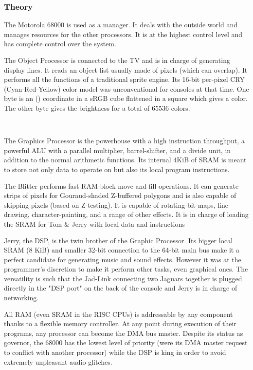 \subsubsection{Theory}
\par
The Motorola 68000 is used as a manager. It deals with the outside world and manages resources for the other processors. It is at the highest control level and has complete control over the system.\\
\par
The Object Processor is connected to the TV and is in charge of generating display lines. It reads an object list usually made of pixels (which can overlap). It performs all the functions of a traditional sprite engine. Its 16-bit per-pixel CRY (Cyan-Red-Yellow) color model was unconventional for consoles at that time. One byte is an () coordinate in a sRGB cube flattened in a square which gives a color. The other byte gives the brightness for a total of 65536 colors.\\
\par
{}\\
\par

\par
The Graphics Processor is the powerhouse with a high instruction throughput, a powerful ALU with a parallel multiplier, barrel-shifter, and a divide unit, in addition to the normal arithmetic functions. Its internal 4KiB of SRAM is meant to store not only data to operate on but also its local program instructions.\\
\par
The Blitter performs fast RAM block move and fill operations. It can generate strips of pixels for Gouraud-shaded Z-buffered polygons and is also capable of skipping pixels (based on Z-testing). It is capable of rotating bit-maps, line-drawing, character-painting, and a range of other effects. It is in charge of loading the SRAM for Tom \& Jerry with local data and instructions\\
\par
Jerry, the DSP, is the twin brother of the Graphic Processor. Its bigger local SRAM (8 KiB) and smaller 32-bit connection to the 64-bit main bus make it a perfect candidate for generating music and sound effects. However it was at the programmer's discretion to make it perform other tasks, even graphical ones. The versatility is such that the Jad-Link connecting two Jaguars together is plugged directly in the "DSP port" on the back of the console and Jerry is in charge of networking.\\
\par
All RAM (even SRAM in the RISC CPUs) is addressable by any component thanks to a flexible memory controller. At any point during execution of their programs, any processor can become the DMA bus master. Despite its status as governor, the 68000 has the lowest level of priority (were its DMA master request to conflict with another processor) while the DSP is king in order to avoid extremely unpleasant audio glitches.
\par



